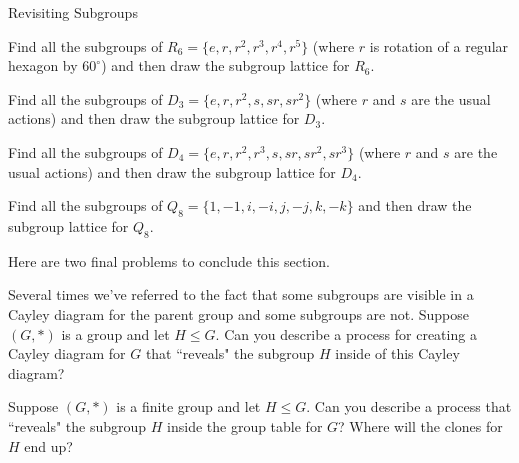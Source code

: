 \begin{section}{Revisiting Subgroups}
\begin{exercise}
Find all the subgroups of \(R_6=\{e,r,r^2,r^3,r^4,r^5\}\) (where \(r\) is rotation of a regular hexagon by \(60^{\circ}\)) and then draw the subgroup lattice for \(R_6\).
\end{exercise}

\begin{exercise}
Find all the subgroups of \(D_3=\{e,r,r^2,s,sr,sr^2\}\) (where \(r\) and \(s\) are the usual actions) and then draw the subgroup lattice for \(D_3\).
\end{exercise}

\begin{exercise}
Find all the subgroups of \(D_4=\{e,r,r^2,r^3,s,sr,sr^2,sr^3\}\) (where \(r\) and \(s\) are the usual actions) and then draw the subgroup lattice for \(D_4\).
\end{exercise}

\begin{exercise}
Find all the subgroups of \(Q_8=\{1,-1,i,-i,j,-j,k,-k\}\) and then draw the subgroup lattice for \(Q_8\).
\end{exercise}

Here are two final problems to conclude this section.

\begin{problem}
Several times we've referred to the fact that some subgroups are visible in a Cayley diagram for the parent group and some subgroups are not.  Suppose \((G,*)\) is a group and let \(H\leq G\).  Can you describe a process for creating a Cayley diagram for \(G\) that ``reveals" the subgroup \(H\) inside of this Cayley diagram?
\end{problem}

\begin{problem}
Suppose \((G,*)\) is a finite group and let \(H\leq G\).  Can you describe a process that ``reveals" the subgroup \(H\) inside the group table for \(G\)?  Where will the clones for \(H\) end up?
\end{problem}

\end{section}

